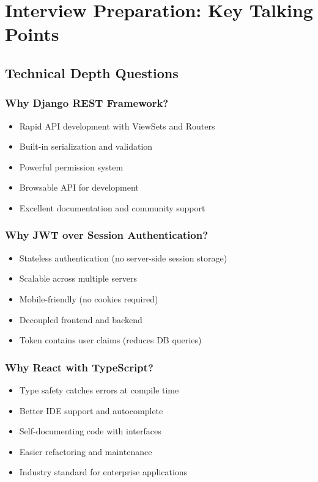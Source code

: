 \documentclass[11pt,a4paper]{article}
\begin{document}
\section{Interview Preparation: Key Talking Points}

\subsection{Technical Depth Questions}

\subsubsection{Why Django REST Framework?}
\begin{itemize}[leftmargin=*]
    \item Rapid API development with ViewSets and Routers
    \item Built-in serialization and validation
    \item Powerful permission system
    \item Browsable API for development
    \item Excellent documentation and community support
\end{itemize}

\subsubsection{Why JWT over Session Authentication?}
\begin{itemize}[leftmargin=*]
    \item Stateless authentication (no server-side session storage)
    \item Scalable across multiple servers
    \item Mobile-friendly (no cookies required)
    \item Decoupled frontend and backend
    \item Token contains user claims (reduces DB queries)
\end{itemize}

\subsubsection{Why React with TypeScript?}
\begin{itemize}[leftmargin=*]
    \item Type safety catches errors at compile time
    \item Better IDE support and autocomplete
    \item Self-documenting code with interfaces
    \item Easier refactoring and maintenance
    \item Industry standard for enterprise applications
\end{itemize}
\end{document}
